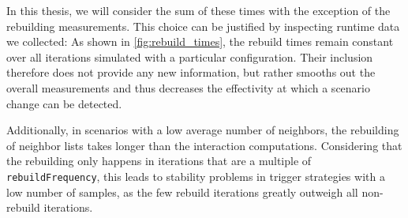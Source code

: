 In this thesis, we will consider the sum of these times with the exception of the rebuilding measurements. This choice can be justified by inspecting runtime data we collected: As shown  in \autoref{fig:rebuild_times}, the rebuild times remain constant over all iterations simulated with a particular configuration. Their inclusion therefore does not provide any new information, but rather smooths out the overall measurements and thus decreases the effectivity at which a scenario change can be detected.

Additionally, in scenarios with a low average number of neighbors, the rebuilding of neighbor lists takes longer than the interaction computations. Considering that the rebuilding only happens in iterations that are a multiple of \texttt{rebuildFrequency}, this leads to stability problems in trigger strategies with a low number of samples, as the few rebuild iterations greatly outweigh all non-rebuild iterations.

